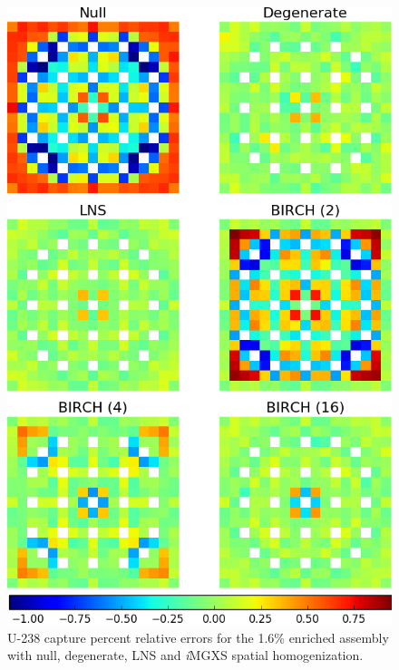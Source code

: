 \begin{figure}[h!]
\centering
\includegraphics[width=0.9\linewidth]{figures/results/spatial/assm-16/capt-err}
\vspace{2mm}
\caption[U-238 capture errors for the 1.6\% enriched assembly]{U-238 capture percent relative errors for the 1.6\% enriched assembly with null, degenerate, \ac{LNS} and \textit{i}\ac{MGXS} spatial homogenization.}
\label{fig:chap11-assm-1.6-capt-err}
\end{figure}

\clearpage

